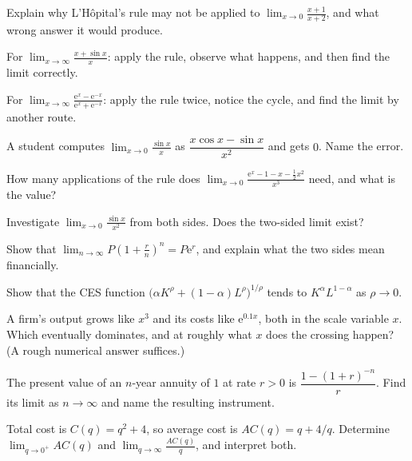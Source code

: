 \begin{problems}[resume]
  \item Explain why L'H\^opital's rule may not be applied to
        $\displaystyle\lim_{x\to0}\frac{x+1}{x+2}$, and what wrong answer
        it would produce.
  \item For $\displaystyle\lim_{x\to\infty}\frac{x+\sin x}{x}$: apply the
        rule, observe what happens, and then find the limit correctly.
  \item For $\displaystyle\lim_{x\to\infty}
        \frac{\mathrm{e}^{x}-\mathrm{e}^{-x}}{\mathrm{e}^{x}+\mathrm{e}^{-x}}$:
        apply the rule twice, notice the cycle, and find the limit by
        another route.
  \item A student computes $\displaystyle\lim_{x\to0}\frac{\sin x}{x}$ as
        $\dfrac{x\cos x-\sin x}{x^{2}}$ and gets $0$. Name the error.
  \item How many applications of the rule does
        $\displaystyle\lim_{x\to0}
        \frac{\mathrm{e}^{x}-1-x-\tfrac12 x^{2}}{x^{3}}$ need, and what is
        the value?
  \item Investigate $\displaystyle\lim_{x\to0}\frac{\sin x}{x^{2}}$ from
        both sides. Does the two-sided limit exist?
\end{problems}

\begin{problems}[resume]
  \item Show that $\displaystyle\lim_{n\to\infty}
        P\left(1+\frac{r}{n}\right)^{n}=P\mathrm{e}^{r}$, and explain what
        the two sides mean financially.
  \item Show that the CES function
        $\bigl(\alpha K^{\rho}+(1-\alpha)L^{\rho}\bigr)^{1/\rho}$ tends to
        $K^{\alpha}L^{1-\alpha}$ as $\rho\to0$.
  \item A firm's output grows like $x^{3}$ and its costs like
        $\mathrm{e}^{0.1x}$, both in the scale variable $x$. Which
        eventually dominates, and at roughly what $x$ does the crossing
        happen? (A rough numerical answer suffices.)
  \item The present value of an $n$-year annuity of $1$ at rate $r>0$ is
        $\dfrac{1-(1+r)^{-n}}{r}$. Find its limit as $n\to\infty$ and name
        the resulting instrument.
  \item Total cost is $C(q)=q^{2}+4$, so average cost is
        $AC(q)=q+4/q$. Determine $\displaystyle\lim_{q\to0^{+}}AC(q)$ and
        $\displaystyle\lim_{q\to\infty}\frac{AC(q)}{q}$, and interpret
        both.
\end{problems}


